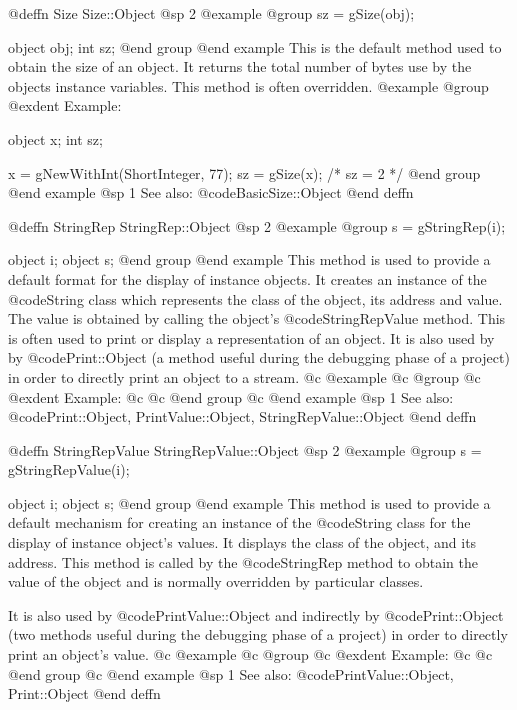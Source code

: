 @deffn {Size} Size::Object
@sp 2
@example
@group
sz = gSize(obj);

object  obj;
int     sz;
@end group
@end example
This is the default method used to obtain the size of an object.
It returns the total number of bytes use by the objects instance variables.
This method is often overridden.
@example
@group
@exdent Example:

object  x;
int     sz;

x = gNewWithInt(ShortInteger, 77);
sz = gSize(x);    /*  sz = 2  */
@end group
@end example
@sp 1
See also:  @code{BasicSize::Object}
@end deffn












@deffn {StringRep} StringRep::Object
@sp 2
@example
@group
s = gStringRep(i);

object  i;
object  s;
@end group
@end example
This method is used to provide a default format for the display of
instance objects.  It creates an instance of the @code{String} class
which represents the class of the object, its address and value.  The
value is obtained by calling the object's @code{StringRepValue} method.
This is often used to print or display a representation of an object.
It is also used by by @code{Print::Object} (a method useful during the
debugging phase of a project) in order to directly print an object to a
stream.
@c @example
@c @group
@c @exdent Example:
@c 
@c @end group
@c @end example
@sp 1
See also:  @code{Print::Object, PrintValue::Object, StringRepValue::Object}
@end deffn











@deffn {StringRepValue} StringRepValue::Object
@sp 2
@example
@group
s = gStringRepValue(i);

object  i;
object  s;
@end group
@end example
This method is used to provide a default mechanism for creating an
instance of the @code{String} class for the display of instance object's
values.  It displays the class of the object, and its address.  This
method is called by the @code{StringRep} method to obtain the value of
the object and is normally overridden by particular classes.

It is also used by @code{PrintValue::Object} and indirectly by
@code{Print::Object} (two methods useful during the debugging phase of a
project) in order to directly print an object's value.
@c @example
@c @group
@c @exdent Example:
@c 
@c @end group
@c @end example
@sp 1
See also:  @code{PrintValue::Object, Print::Object}
@end deffn















